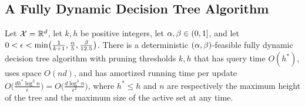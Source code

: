 

\subsection{A Fully Dynamic Decision Tree Algorithm}\label{sec:dyn}


\begin{theorem}\label{thm:main_UB}
Let $\mathcal{X}=\mathbb{R}^d$, let $k,h$ be positive integers, let $\alpha,\beta \in (0,1]$, and let $0 < \epsilon < \min\!\big(\frac{1}{k+1},\frac{\alpha}{5},\frac{\beta}{12.5}\big)$. There is a deterministic $(\alpha,\beta)$-feasible fully dynamic decision tree algorithm with pruning thresholds $k,h$ that has query time $O(h^*)$, uses space $O(nd)$, and has amortized running time per update $O\big(\frac{d h^{\!*} \log^2 n}{ \epsilon}\big) = O\big(\frac{d \log^3 n}{\epsilon^2}\big)$, where $h^*\le h$ and $n$ are respectively the maximum height of the tree and the maximum size of the active set at any time.
\end{theorem}


